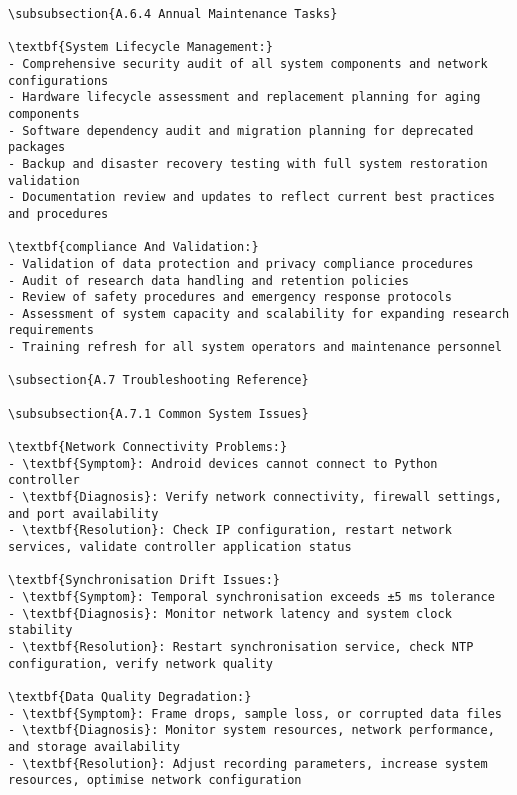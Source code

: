 \begin{verbatim}
\subsubsection{A.6.4 Annual Maintenance Tasks}

\textbf{System Lifecycle Management:}
- Comprehensive security audit of all system components and network configurations
- Hardware lifecycle assessment and replacement planning for aging components
- Software dependency audit and migration planning for deprecated packages
- Backup and disaster recovery testing with full system restoration validation
- Documentation review and updates to reflect current best practices and procedures

\textbf{compliance And Validation:}
- Validation of data protection and privacy compliance procedures
- Audit of research data handling and retention policies
- Review of safety procedures and emergency response protocols
- Assessment of system capacity and scalability for expanding research requirements
- Training refresh for all system operators and maintenance personnel

\subsection{A.7 Troubleshooting Reference}

\subsubsection{A.7.1 Common System Issues}

\textbf{Network Connectivity Problems:}
- \textbf{Symptom}: Android devices cannot connect to Python controller
- \textbf{Diagnosis}: Verify network connectivity, firewall settings, and port availability
- \textbf{Resolution}: Check IP configuration, restart network services, validate controller application status

\textbf{Synchronisation Drift Issues:}
- \textbf{Symptom}: Temporal synchronisation exceeds ±5 ms tolerance
- \textbf{Diagnosis}: Monitor network latency and system clock stability
- \textbf{Resolution}: Restart synchronisation service, check NTP configuration, verify network quality

\textbf{Data Quality Degradation:}
- \textbf{Symptom}: Frame drops, sample loss, or corrupted data files
- \textbf{Diagnosis}: Monitor system resources, network performance, and storage availability
- \textbf{Resolution}: Adjust recording parameters, increase system resources, optimise network configuration


\end{verbatim}
